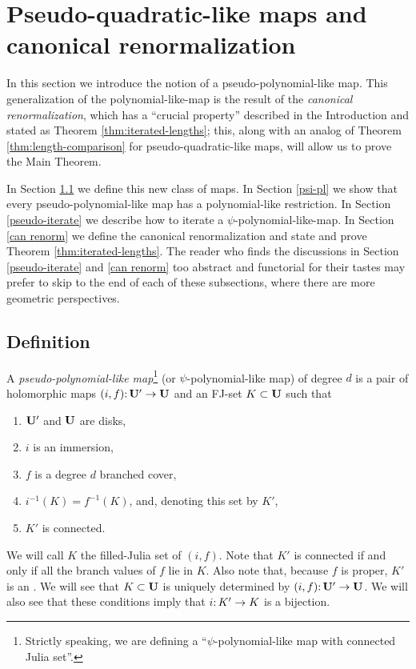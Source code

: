 
\section{Pseudo-quadratic-like maps and canonical renormalization} \label{pseudo-puzzle}
In this section we introduce the notion of a pseudo-polynomial-like map. 
This generalization of the polynomial-like-map is the result of the \emph{canonical renormalization}, 
which has a ``crucial property'' described in the Introduction and stated as Theorem \ref{thm:iterated-lengths};
this, 
along with an analog of Theorem \ref{thm:length-comparison} for pseudo-quadratic-like maps,
will allow us to prove the Main Theorem.

In Section \ref{pseudo:def} we define this new class of maps. 
In Section \ref{psi-pl} we show that every pseudo-polynomial-like map has a polynomial-like restriction. 
In Section \ref{pseudo-iterate} we describe how to iterate a $\psi$-polynomial-like-map. 
In Section \ref{can renorm} we define the canonical renormalization and state and prove Theorem \ref{thm:iterated-lengths}. 
The reader who finds the discussions in Section \ref{pseudo-iterate} and \ref{can renorm} too abstract and functorial for their tastes may prefer to skip to the end of each of these subsections, where there are more geometric perspectives. 
\subsection{Definition} \label{pseudo:def}
\begin{defn}
A \emph{pseudo-polynomial-like map}\footnote{Strictly speaking,
 we are defining a ``$\psi$-polynomial-like map with connected Julia set''.}
(or $\psi$-polynomial-like map)
of degree $d$ is a pair of holomorphic maps $(i, f)\mathpunct: \mathbf U'\to \mathbf U$ and an FJ-set $K \subset \mathbf U$ such that
\begin{enumerate}
\item 
$\mathbf U'$ and $\mathbf U$ are disks,
\item
$i$ is an immersion,
\item 
$f$ is a degree $d$ branched cover,
\item
$i^{-1}(K) = f^{-1}(K)$, and, denoting this set by $K'$,
\item
$K'$ is connected.
\end{enumerate}
\end{defn}
We will call $K$ the filled-Julia set of $(i, f)$. 
Note that $K'$ is connected if and only if
 all the branch values of $f$ lie in $K$.
Also note that,
because $f$ is proper,
$K'$ is an \fjset.
We will see that $K \subset \mathbf U$ is uniquely determined by $(i, f)\mathpunct: \mathbf U' \to \mathbf U$.
We will also see that these conditions imply that $i\mathpunct: K'\to K$ is a bijection.

